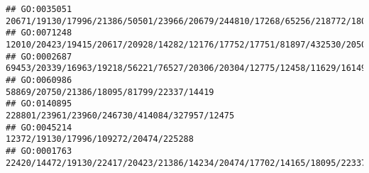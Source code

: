 \documentclass[
]{article}
\begin{document}
\begin{verbatim}
## GO:0035051                                                                                                                                                                                                                                                                                                                             20671/19130/17996/21386/50501/23966/20679/244810/17268/65256/218772/18092/225288
## GO:0071248                                                                                                                                                                                                                                                                                                                               12010/20423/19415/20617/20928/14282/12176/17752/17751/81897/432530/20500/18164
## GO:0002687                                                                                                                                                                                                                                                                                                                                      69453/20339/16963/19218/56221/76527/20306/20304/12775/12458/11629/16149
## GO:0060986                                                                                                                                                                                                                                                                                                                                                                    58869/20750/21386/18095/81799/22337/14419
## GO:0140895                                                                                                                                                                                                                                                                                                                                                                228801/23961/23960/246730/414084/327957/12475
## GO:0045214                                                                                                                                                                                                                                                                                                                                                                        12372/19130/17996/109272/20474/225288
## GO:0001763                                                                                                                                                                                                                                                                                                                   22420/14472/19130/22417/20423/21386/14234/20474/17702/14165/18095/22337/21380/104156/12705

\end{verbatim}
\end{document}
